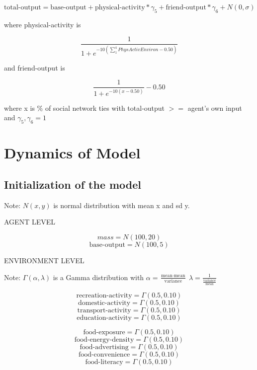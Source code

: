 \documentclass[12pt]{article}
\begin{document}
\begin{equation}
\text{total-output} = \text{base-output} + \text{physical-activity}*\gamma_5 + \text{friend-output}*\gamma_6 + N(0, \sigma)
\end{equation}

where  physical-activity is

\begin{equation}
\frac{1}{1 + e^{-10(\sum_{1}^{4}PhysActivEnviron - 0.50)}}
\end{equation}

and friend-output is

\begin{equation}
\frac{1}{1 + e^{-10(x - 0.50)}} - 0.50
\end{equation}


where x is \% of social network ties with total-output $>=$ agent's own input and $\gamma_5, \gamma_6 = 1$


\section{Dynamics of Model}

\subsection{Initialization of the model}

Note: $N(x,y)$ is normal distribution with mean x and sd y.

AGENT LEVEL

$$ mass = N(100, 20)$$
$$ \text{base-output} = N(100, 5)$$

ENVIRONMENT LEVEL

Note: $\Gamma(\alpha, \lambda)$ is a Gamma distribution with
$\alpha = \frac{\text{mean} \cdot \text{mean}}{\text{variance}}$
$\lambda = \frac{1}{\frac{\text{variance}}{\text{mean}}}$

$$ \text{recreation-activity} = \Gamma(0.5, 0.10) $$
$$ \text{domestic-activity} = \Gamma(0.5, 0.10) $$
$$ \text{transport-activity} = \Gamma(0.5, 0.10) $$
$$ \text{education-activity} = \Gamma(0.5, 0.10) $$

$$ \text{food-exposure} = \Gamma(0.5, 0.10) $$
$$ \text{food-energy-density} = \Gamma(0.5, 0.10) $$
$$ \text{food-advertising} = \Gamma(0.5, 0.10) $$
$$ \text{food-convenience} = \Gamma(0.5, 0.10) $$
$$ \text{food-literacy} = \Gamma(0.5, 0.10) $$
\end{document}
